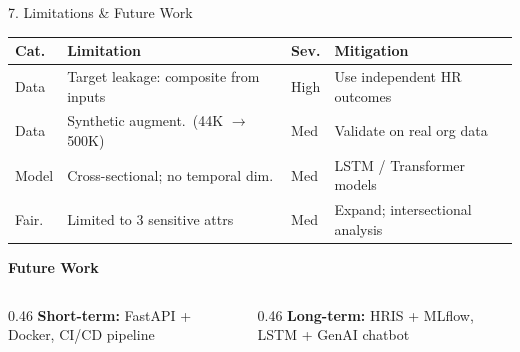 \documentclass[aspectratio=169, 10pt]{beamer}
\begin{document}
\begin{frame}{7. Limitations \& Future Work}
\footnotesize
\begin{tabular}{@{}p{0.9cm} p{3.4cm} p{0.7cm} p{4cm}@{}}
  \toprule
  \textbf{Cat.} & \textbf{Limitation} & \textbf{Sev.} & \textbf{Mitigation} \\
  \midrule
  Data  & Target leakage: composite from inputs & \textcolor{red500}{High} & Use independent HR outcomes \\[2pt]
  Data  & Synthetic augment.\ (44K $\to$ 500K) & \textcolor{amber}{Med} & Validate on real org data \\[2pt]
  Model & Cross-sectional; no temporal dim. & \textcolor{amber}{Med} & LSTM / Transformer models \\[2pt]
  Fair. & Limited to 3 sensitive attrs & \textcolor{amber}{Med} & Expand; intersectional analysis \\
  \bottomrule
\end{tabular}

\vspace{6pt}
\small
\textbf{\color{teal}Future Work}\\[2pt]
\begin{columns}[T]
\begin{column}{0.46\textwidth}
  \footnotesize
  \textbf{Short-term:} FastAPI + Docker, CI/CD pipeline
\end{column}
\begin{column}{0.46\textwidth}
  \footnotesize
  \textbf{Long-term:} HRIS + MLflow, LSTM + GenAI chatbot
\end{column}
\end{columns}
\end{frame}
\end{document}
